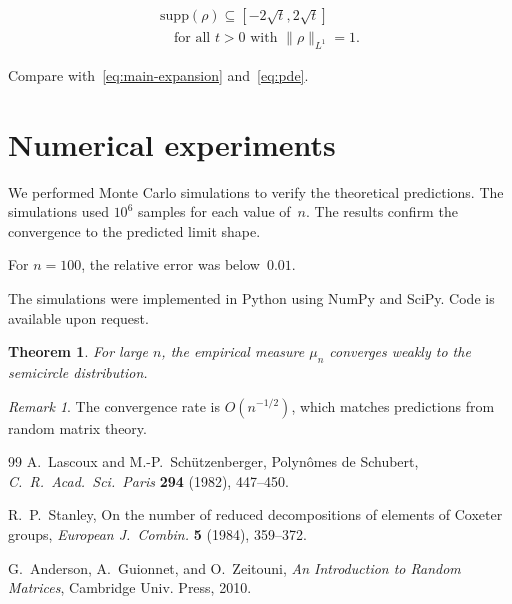 \documentclass{amsart}
\theoremstyle{plain}
\newtheorem{theorem}{Theorem}[section]
\theoremstyle{definition}
\theoremstyle{remark}
\newtheorem*{remark}{Remark}
\begin{document}
\begin{multline}
\label{eq:support-bound}
\mathrm{supp}(\rho) \subseteq [-2\sqrt{t}, 2\sqrt{t}] \\
\quad \text{for all } t > 0 \text{ with } \|\rho\|_{L^1} = 1.
\end{multline}

Compare with~\eqref{eq:main-expansion} and~\ref{eq:pde}.

\section{Numerical experiments}
\label{sec:numerical}
	We performed Monte Carlo simulations to verify the theoretical
	predictions.  The simulations used $10^6$ samples for each value
	of~$n$.	The results confirm the convergence to the predicted
	limit shape.

	For $n = 100$, the relative error was below~$0.01$.

	The simulations were implemented in Python using NumPy and SciPy.
	Code is available upon request.

\begin{theorem}
For large $n$, the empirical measure $\mu_n$ converges weakly to the
semicircle distribution.
\end{theorem}

\begin{remark}
The convergence rate is $O(n^{-1/2})$, which matches predictions from
random matrix theory.
\end{remark}

\begin{thebibliography}{99}
 A.~Lascoux and M.-P.~Sch\"utzenberger,
  Polyn\^omes de Schubert,
  \emph{C.~R.~Acad.~Sci.~Paris} \textbf{294} (1982), 447--450.

 R.~P.~Stanley,
  On the number of reduced decompositions of elements of Coxeter groups,
  \emph{European J.~Combin.} \textbf{5} (1984), 359--372.

 G.~Anderson, A.~Guionnet, and O.~Zeitouni,
  \emph{An Introduction to Random Matrices},
  Cambridge Univ. Press, 2010.
\end{thebibliography}
\end{document}
